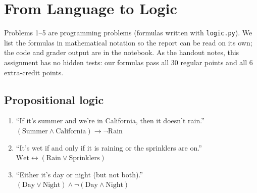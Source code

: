\section{From Language to Logic}
\label{sec:logic}

Problems 1--5 are programming problems (formulas written with \texttt{logic.py}). We list the formulas in
mathematical notation so the report can be read on its own; the code and grader output are in the notebook. As the
handout notes, this assignment has no hidden tests: our formulas pass all 30 regular points and all 6 extra-credit
points.

\subsection{Propositional logic}
\begin{enumerate}[label=(1\alph*)]
  \item ``If it's summer and we're in California, then it doesn't rain.'' \quad
        $(\text{Summer}\wedge\text{California})\to\neg\text{Rain}$
  \item ``It's wet if and only if it is raining or the sprinklers are on.'' \quad
        $\text{Wet}\leftrightarrow(\text{Rain}\vee\text{Sprinklers})$
  \item ``Either it's day or night (but not both).'' \quad
        $(\text{Day}\vee\text{Night})\wedge\neg(\text{Day}\wedge\text{Night})$
\end{enumerate}


